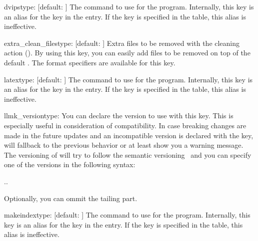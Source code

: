 \documentclass[draft]{llmk-doc}
\begin{document}
\begin{confkey}{dvips}{type: }[default: ]
The command to use for the  program. Internally, this key is an
alias for the  key in the  entry. If the
 key is specified in the  table, this alias is
ineffective.
\end{confkey}

\begin{confkey}{extra\_clean\_files}{type: }
  [default: \code{[]}]
Extra files to be removed with the cleaning action (). By using
this key, you can easily add files to be removed on top of the default
. The format specifiers are available for this key.
\end{confkey}

\begin{confkey}{latex}{type: }[default: ]
The command to use for the  program. Internally, this key is an
alias for the  key in the  entry. If the
 key is specified in the  table, this alias is
ineffective.
\end{confkey}

\begin{confkey}{llmk\_version}{type: }
You can declare the  version to use with this key. This is
especially useful in consideration of compatibility. In case breaking changes
are made in the future updates and an incompatible version is declared with the
key,  will fallback to the previous behavior or at least show you a
warning message. The versioning of  will try to follow the semantic
versioning~\cite{semvar} and you can specify one of the versions in the
following syntax:
%
\begin{htcode}
..
\end{htcode}
%
Optionally, you can ommit the tailing  part.
\end{confkey}

\begin{confkey}{makeindex}{type: }[default: ]
The command to use for the  program. Internally, this key
is an alias for the  key in the  entry. If
the  key is specified in the  table, this alias is
ineffective.
\end{confkey}
\end{document}
